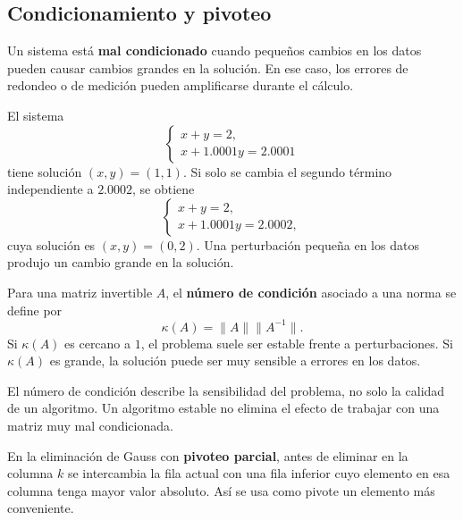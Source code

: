 \documentclass[a4,11pt]{aleph-notas}
\begin{document}
\subsection{Condicionamiento y pivoteo}

\begin{defi}
    Un sistema está \textbf{mal condicionado} cuando pequeños cambios en los datos pueden causar cambios grandes en la solución. En ese caso, los errores de redondeo o de medición pueden amplificarse durante el cálculo.
\end{defi}

\begin{ejem}
    El sistema
    \[
        \begin{cases}
            x+y=2,\\
            x+1.0001y=2.0001
        \end{cases}
    \]
    tiene solución $(x,y)=(1,1)$. Si solo se cambia el segundo término independiente a $2.0002$, se obtiene
    \[
        \begin{cases}
            x+y=2,\\
            x+1.0001y=2.0002,
        \end{cases}
    \]
    cuya solución es $(x,y)=(0,2)$. Una perturbación pequeña en los datos produjo un cambio grande en la solución.
\end{ejem}

\begin{defi}
    Para una matriz invertible $A$, el \textbf{número de condición} asociado a una norma se define por
    \[
        \kappa(A)=\|A\|\|A^{-1}\|.
    \]
    Si $\kappa(A)$ es cercano a $1$, el problema suele ser estable frente a perturbaciones. Si $\kappa(A)$ es grande, la solución puede ser muy sensible a errores en los datos.
\end{defi}

\begin{advertencia}
    El número de condición describe la sensibilidad del problema, no solo la calidad de un algoritmo. Un algoritmo estable no elimina el efecto de trabajar con una matriz muy mal condicionada.
\end{advertencia}

\begin{defi}
    En la eliminación de Gauss con \textbf{pivoteo parcial}, antes de eliminar en la columna $k$ se intercambia la fila actual con una fila inferior cuyo elemento en esa columna tenga mayor valor absoluto. Así se usa como pivote un elemento más conveniente.
\end{defi}
\end{document}
